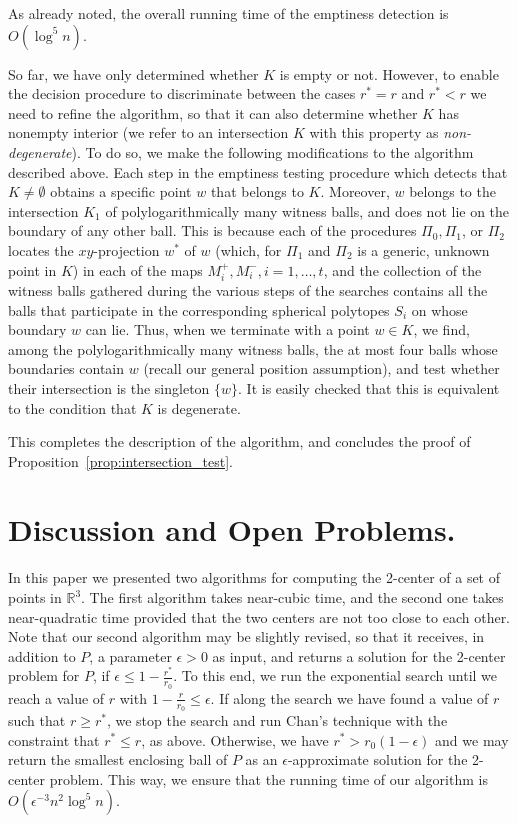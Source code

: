 \documentclass[a4paper,12pt]{article}
\def\reals{\mathbb{R}}
\begin{document}
As already noted, the overall running time of the emptiness
detection is $O(\log^5 n)$.

So far, we have only determined whether $K$ is empty or not.
However, to enable the decision procedure to discriminate between
the cases $r^* = r$ and $r^* < r$ we need to refine the algorithm,
so that it can also determine whether $K$ has nonempty interior (we
refer to an intersection $K$ with this property as
\emph{non-degenerate}).  To do so, we make the following
modifications to the algorithm described above. Each step in the
emptiness testing procedure which detects that $K \neq \emptyset$
obtains a specific point $w$ that belongs to $K$. Moreover, $w$
belongs to the intersection $K_1$ of polylogarithmically many
witness balls, and does not lie on the boundary of any other ball.
This is because each of the procedures $\Pi_0, \Pi_1$, or $\Pi_2$
locates the $xy$-projection $w^*$ of $w$ (which, for $\Pi_1$ and
$\Pi_2$ is a generic, unknown point in $K$) in each of the maps
$M_i^+, M_i^-, i = 1,\ldots,t$, and the collection of the witness
balls gathered during the various steps of the searches contains all
the balls that participate in the corresponding spherical polytopes
$S_i$ on whose boundary $w$ can lie. Thus, when we terminate with a
point $w \in K$, we find, among the polylogarithmically many witness
balls, the at most four balls whose boundaries contain $w$ (recall
our general position assumption), and test whether their
intersection is the singleton $\{w\}$. It is easily checked that
this is equivalent to the condition that $K$ is degenerate.

This completes the description of the algorithm, and concludes the
proof of Proposition~\ref{prop:intersection_test}.


\section{Discussion and Open Problems.}
\label{sec:discussion} In this paper we presented two algorithms for
computing the 2-center of a set of points in $\reals^3$. The first
algorithm takes near-cubic time, and the second one takes
near-quadratic time provided that the two centers are not too close
to each other. Note that our second algorithm may be slightly
revised, so that it receives, in addition to $P$, a parameter
$\epsilon > 0$ as input, and returns a solution for the 2-center
problem for $P$, if $\epsilon \leq 1-\frac{r^*}{r_0}$. To this end,
we run the exponential search until we reach a value of $r$ with
$1-\frac{r}{r_0} \leq \epsilon$. If along the search we have found a
value of $r$ such that $r \geq r^*$, we stop the search and run
Chan's technique with the constraint that $r^* \leq r$, as above.
Otherwise, we have $r^* > r_0(1-\epsilon)$ and we may return the
smallest enclosing ball of $P$ as an $\epsilon$-approximate solution
for the 2-center problem. This way, we ensure that the running time
of our algorithm is $O(\epsilon^{-3} n^2\log^5 n)$.
\end{document}
